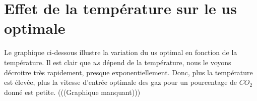 \documentclass[11pt]{report}
\begin{document}
        \section{Effet de la température sur le us optimale}
            Le graphique ci-dessous illustre la variation du us optimal en fonction de la température.
            Il est clair que $us$ dépend de la température, nous le voyons décroitre très rapidement,
            presque exponentiellement. Donc, plus la température est élevée, plus la vitesse d'entrée
            optimale des gaz pour un pourcentage de $CO_2$ donné est petite.
            (((Graphique manquant)))
\end{document}
